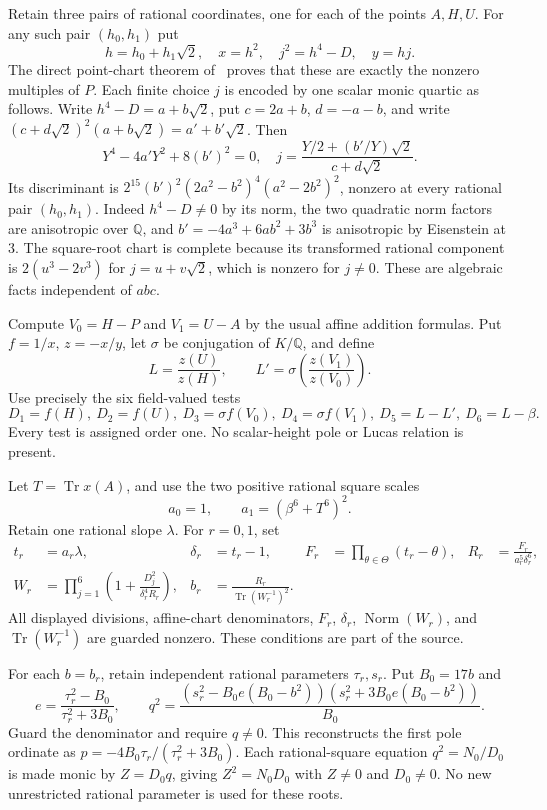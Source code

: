 \documentclass[11pt,a4paper]{article}
\newcommand{\Q}{\mathbb Q}\newcommand{\Z}{\mathbb Z}
\DeclareMathOperator{\Tr}{Tr}\DeclareMathOperator{\rad}{rad}
\begin{document}
Retain three pairs of rational coordinates, one for each of the
points $A,H,U$. For any such pair $(h_0,h_1)$ put
\[
 h=h_0+h_1\sqrt2,\quad x=h^2,\quad j^2=h^4-D,\quad y=hj.
\]
The direct point-chart theorem of~\cite{Source27} proves that
these are exactly the nonzero multiples of $P$. Each finite
choice $j$ is encoded by one scalar monic quartic as follows.
Write $h^4-D=a+b\sqrt2$, put
$c=2a+b$, $d=-a-b$, and write
$(c+d\sqrt2)^2(a+b\sqrt2)=a'+b'\sqrt2$.
Then
\[
 Y^4-4a'Y^2+8(b')^2=0,\quad
 j=\frac{Y/2+(b'/Y)\sqrt2}{c+d\sqrt2}.
\]
Its discriminant is
$2^{15}(b')^2(2a^2-b^2)^4(a^2-2b^2)^2$, nonzero at every
rational pair $(h_0,h_1)$. Indeed $h^4-D\ne0$ by its norm,
the two quadratic norm factors are anisotropic over $\Q$, and
$b'=-4a^3+6ab^2+3b^3$ is anisotropic by Eisenstein at 3.
The square-root chart is complete because its transformed rational
component is $2(u^3-2v^3)$ for $j=u+v\sqrt2$, which is nonzero
for $j\ne0$. These are algebraic facts independent of $abc$.

Compute $V_0=H-P$ and $V_1=U-A$ by the usual affine addition
formulas. Put $f=1/x$, $z=-x/y$, let $\sigma$ be conjugation
of $K/\Q$, and define
\[
 L=\frac{z(U)}{z(H)},\qquad
 L'=\sigma\!\left(\frac{z(V_1)}{z(V_0)}\right).
\]
Use precisely the six field-valued tests
\begin{equation}\label{eq:tests}
 D_1=f(H),\ D_2=f(U),\ D_3=\sigma f(V_0),\
 D_4=\sigma f(V_1),\ D_5=L-L',\ D_6=L-\beta.
\end{equation}
Every test is assigned order one. No scalar-height pole or Lucas
relation is present.

Let $T=\Tr x(A)$, and use the two positive rational square scales
\[
                         a_0=1,\qquad a_1=(\beta^6+T^6)^2.
\]
Retain one rational slope $\lambda$. For $r=0,1$, set
\begin{align}
 t_r&=a_r\lambda,&\delta_r&=t_r-1,&
 F_r&=\prod_{\theta\in\Theta}(t_r-\theta),&
 R_r&=\frac{F_r}{a_r^5\delta_r^6},\label{eq:detector}\\
 W_r&=\prod_{j=1}^6\left(1+
             \frac{D_j^2}{\delta_r^4R_r}\right),&
 b_r&=\frac{R_r}{\Tr(W_r^{-1})^2}.\label{eq:W}
\end{align}
All displayed divisions, affine-chart denominators, $F_r$,
$\delta_r$, $\operatorname{Norm}(W_r)$, and $\Tr(W_r^{-1})$
are guarded nonzero. These conditions are part of the source.

For each $b=b_r$, retain independent rational parameters $\tau_r,s_r$.
Put $B_0=17b$ and
\[
 e=\frac{\tau_r^2-B_0}{\tau_r^2+3B_0},\qquad
 q^2=\frac{(s_r^2-B_0e(B_0-b^2))
                  (s_r^2+3B_0e(B_0-b^2))}{B_0}.
\]
Guard the denominator and require $q\ne0$. This reconstructs
the first pole ordinate as
$p=-4B_0\tau_r/(\tau_r^2+3B_0)$.
Each rational-square equation $q^2=N_0/D_0$ is made monic
by $Z=D_0q$, giving $Z^2=N_0D_0$ with $Z\ne0$ and $D_0\ne0$.
No new unrestricted rational parameter is used for these roots.
\end{document}

